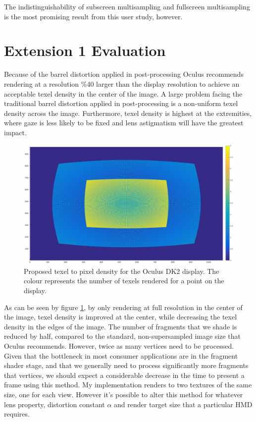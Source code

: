 \documentclass[12pt,a4paper,twoside,openright]{report}
\begin{document}
The indistinguishability of subscreen multisampling and fullscreen multisampling is the most promising result from this user study, however.

\clearpage

\section{Extension 1 Evaluation}

Because of the barrel distortion applied in post-processing Oculus recommends rendering at a resolution \%40 larger than the display resolution to achieve an acceptable texel density in the center of the image.
A large problem facing the traditional barrel distortion applied in post-processing is a non-uniform texel density across the image. Furthermore, texel density is highest at the extremities, where gaze is less likely to be fixed and lens astigmatism will have the greatest impact. 

\begin{centering}
\begin{figure}[tbh]
\includegraphics[width=1.0\linewidth]{figs/oculus_pixel_density_optimisation.eps}
\caption{Proposed texel to pixel density for the Oculus DK2 display. The colour represents the number of texels rendered for a point on the display.}
\label{fig:barreldensity}
\end{figure}
\end{centering}

\noindent As can be seen by figure \ref{fig:barreldensity}, by only rendering at full resolution in the center of the image, texel density is improved at the center, while decreasing the texel density in the edges of the image. The number of fragments that we shade is reduced by half, compared to the standard, non-supersampled image size that Oculus recommends. However, twice as many vertices need to be processed. Given that the bottleneck in most consumer applications are in the fragment shader stage, and that we generally need to process significantly more fragments that vertices, we should expect a considerable decrease in the time to present a frame using this method. My implementation renders to two textures of the same size, one for each view. However it's possible to alter this method for whatever lens property, distortion constant $\alpha$ and render target size that a particular HMD requires.
\end{document}
